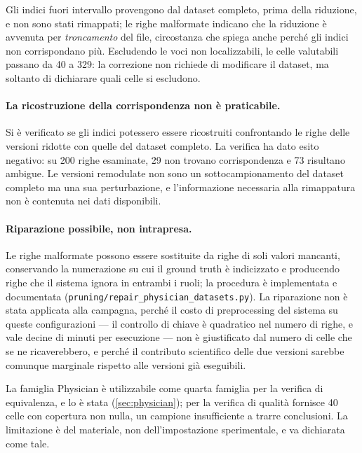 Gli indici fuori intervallo provengono dal dataset completo, prima della riduzione, e non sono
stati rimappati; le righe malformate indicano che la riduzione è avvenuta per \emph{troncamento}
del file, circostanza che spiega anche perché gli indici non corrispondano più. Escludendo le voci
non localizzabili, le celle valutabili passano da \num{40} a \num{329}: la correzione non richiede
di modificare il dataset, ma soltanto di dichiarare quali celle si escludono.

\paragraph{La ricostruzione della corrispondenza non è praticabile.} Si è verificato se gli indici
potessero essere ricostruiti confrontando le righe delle versioni ridotte con quelle del dataset
completo. La verifica ha dato esito negativo: su \num{200} righe esaminate, \num{29} non trovano
corrispondenza e \num{73} risultano ambigue. Le versioni remodulate non sono un sottocampionamento
del dataset completo ma una sua perturbazione, e l'informazione necessaria alla rimappatura non è
contenuta nei dati disponibili.

\paragraph{Riparazione possibile, non intrapresa.} Le righe malformate possono essere sostituite
da righe di soli valori mancanti, conservando la numerazione su cui il ground truth è indicizzato
e producendo righe che il sistema ignora in entrambi i ruoli; la procedura è implementata e
documentata (\texttt{pruning/repair\_physician\_datasets.py}). La riparazione non è stata
applicata alla campagna, perché il costo di preprocessing del sistema su queste configurazioni ---
il controllo di chiave è quadratico nel numero di righe, e vale decine di minuti per esecuzione
--- non è giustificato dal numero di celle che se ne ricaverebbero, e perché il contributo
scientifico delle due versioni sarebbe comunque marginale rispetto alle versioni già eseguibili.

\begin{observation}
La famiglia Physician è utilizzabile come quarta famiglia per la verifica di equivalenza, e lo è
stata (\autoref{sec:physician}); per la verifica di qualità fornisce \num{40} celle con copertura
non nulla, un campione insufficiente a trarre conclusioni. La limitazione è del materiale, non
dell'impostazione sperimentale, e va dichiarata come tale.
\end{observation}

